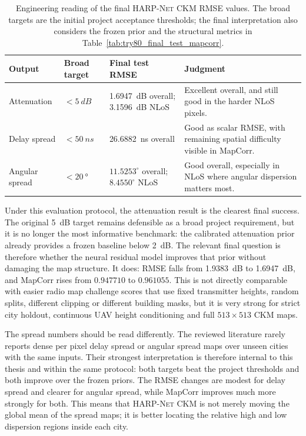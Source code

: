 \begin{table}[!htbp]
\centering
\caption[Engineering reading of the final \textsc{HARP-Net CKM} RMSE values.]%
{Engineering reading of the final \textsc{HARP-Net CKM} RMSE values. The broad
targets are the initial project acceptance thresholds; the final interpretation
also considers the frozen prior and the structural metrics in
Table~\ref{tab:try80_final_test_mapcorr}.}
\label{tab:try80_final_engineering_judgement}
\scriptsize
\begin{tabularx}{\textwidth}{l>{\raggedright\arraybackslash}X>{\raggedright\arraybackslash}X>{\raggedright\arraybackslash}X}
\toprule
Output & Broad target & Final test RMSE & Judgment \\
\midrule
Attenuation &
\(<\SI{5}{dB}\) &
\SI{1.6947}{dB} overall; \SI{3.1596}{dB} NLoS &
Excellent overall, and still good in the harder NLoS pixels. \\
Delay spread &
\(<\SI{50}{ns}\) &
\SI{26.6882}{ns} overall &
Good as scalar RMSE, with remaining spatial difficulty visible in MapCorr. \\
Angular spread &
\(<\SI{20}{\degree}\) &
\(11.5253^\circ\) overall; \(8.4550^\circ\) NLoS &
Good overall, especially in NLoS where angular dispersion matters most. \\
\bottomrule
\end{tabularx}
\end{table}

Under this evaluation protocol, the attenuation result is the clearest final
success. The original \SI{5}{dB} target remains defensible as a broad project
requirement, but it is no longer the most informative benchmark: the calibrated
attenuation prior already provides a frozen baseline below \SI{2}{dB}. The relevant final
question is therefore whether the neural residual model improves that prior
without damaging the map structure. It does: RMSE falls from \SI{1.9383}{dB}
to \SI{1.6947}{dB}, and MapCorr rises from \(0.947710\) to \(0.961055\).
This is not directly comparable with easier radio map challenge scores that use
fixed transmitter heights, random splits, different clipping or different
building masks, but it is very strong for strict city holdout, continuous UAV
height conditioning and full \(513\times513\) CKM maps.

The spread numbers should be read differently. The reviewed literature rarely
reports dense per pixel delay spread or angular spread maps over unseen cities
with the same inputs. Their strongest interpretation is therefore internal to
this thesis and within the same protocol: both targets beat the project
thresholds and both improve over the frozen priors. The RMSE changes are
modest for delay spread and clearer for angular spread, while MapCorr improves
much more strongly for both. This means that \textsc{HARP-Net CKM} is not
merely moving the global mean of the spread maps; it is better locating the
relative high and low dispersion regions inside each city.

